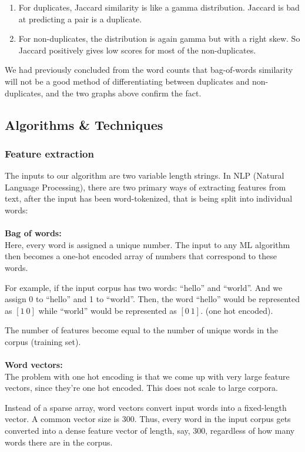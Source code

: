 \documentclass{article}
\begin{document}
\begin{enumerate}
\item{For duplicates, Jaccard similarity is like a gamma distribution. Jaccard is bad at predicting a pair is a duplicate.}
\item{For non-duplicates, the distribution is again gamma but with a right skew. So Jaccard positively gives low scores for most of the non-duplicates.}
\end{enumerate}

We had previously concluded from the word counts that bag-of-words similarity will not be a good method of differentiating between duplicates and non-duplicates, and the two graphs above confirm the fact.

\subsection{Algorithms \& Techniques}

\subsubsection{Feature extraction}

The inputs to our algorithm are two variable length strings. In NLP (Natural Language Processing), there are two primary ways of extracting features from text, after the input has been word-tokenized, that is being split into individual words:
\\\\
\noindent\textbf{Bag of words:}\\
Here, every word is assigned a unique number. The input to any ML algorithm then becomes a one-hot encoded array of numbers that correspond to these words.

For example, if the input corpus has two words: ``hello'' and ``world''. And we assign 0 to ``hello'' and 1 to ``world''. Then, the word ``hello'' would be represented as $[1\ 0]$ while ``world'' would be represented as $[0\ 1]$. (one hot encoded).

The number of features become equal to the number of unique words in the corpus (training set).
\\\\
\noindent\textbf{Word vectors:}\\
The problem with one hot encoding is that we come up with very large feature vectors, since they're one hot encoded. This does not scale to large corpora.

Instead of a sparse array, word vectors convert input words into a fixed-length vector. A common vector size is 300. Thus, every word in the input corpus gets converted into a dense feature vector of length, say, 300, regardless of how many words there are in the corpus.
\end{document}

